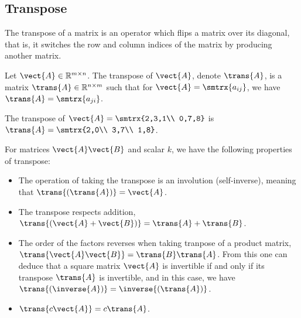 \subsection{Transpose}
The transpose of a matrix is an operator which flips a matrix over its diagonal, that is, it switches the row and column indices of the matrix by producing another matrix.\par 
Let $\vect{A}\in \mathbb{R}^{m\times n}$. The transpose of $\vect{A}$, denote $\trans{A}$, is a matrix $\trans{A}\in \mathbb{R}^{n\times m}$ such that for $\vect{A}=\smtrx{a_{ij}}$, we have $\trans{A}=\smtrx{a_{ji}}$.\par 
\begin{example}
    The transpose of $\vect{A}=\smtrx{2,3,1\\ 0,7,8}$ is $\trans{A}=\smtrx{2,0\\ 3,7\\ 1,8}$.
\end{example}
For matrices $\vect{A}\vect{B}$ and scalar $k$, we have the following properties of transpose:
\begin{itemize}
\item The operation of taking the transpose is an involution (self-inverse), meaning that $\trans{\left( \trans{A} \right)}=\vect{A}$.
\item The transpose respects addition, $\trans{\left( \vect{A}+\vect{B} \right)}=\trans{A}+\trans{B}$.
\item The order of the factors reverses when taking tranpose of a product matrix, $\trans{\vect{A}\vect{B}}=\trans{B}\trans{A}$. From this one can deduce that a square matrix $\vect{A}$ is invertible if and only if its transpose $\trans{A}$ is invertible, and in this case, we have $\trans{\left( \inverse{A} \right)}=\inverse{\left( \trans{A} \right)}$.
\item $\trans{c\vect{A}}=c\trans{A}$.
\end{itemize}

